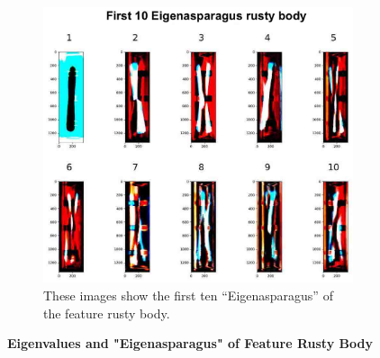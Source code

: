 \begin{figure}[H]
	\begin{subfigure}{0.9\textwidth}
		\includegraphics[width=0.9\linewidth]{Figures/chapter04/pca_rustybody.png}
		\caption{These images show the first ten “Eigenasparagus” of the feature rusty body.}
	\end{subfigure}
    \caption[First ten Eigenvalues and "Eigenasparagus" of Feature Rusty Body]{\textbf{Eigenvalues and "Eigenasparagus" of Feature Rusty Body}}
    \label{fig:PCArustybody}
\end{figure}


